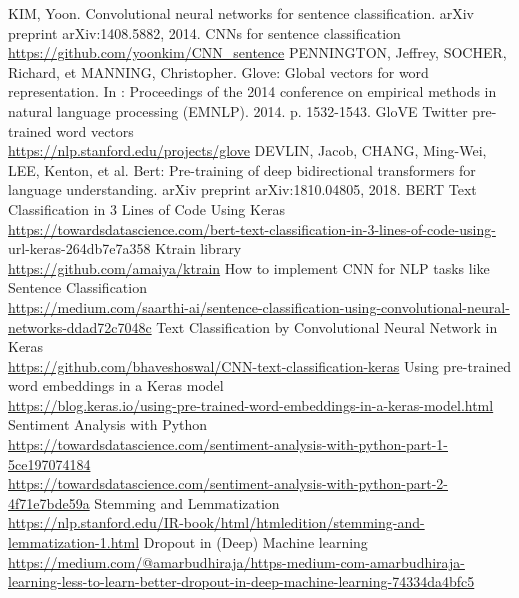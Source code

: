 \documentclass[11pt, a4paper, twocolumn]{article}
\begin{document}
\begin{thebibliography}{9}
		KIM, Yoon. Convolutional neural networks for sentence classification. arXiv preprint arXiv:1408.5882, 2014.
		CNNs for sentence classification
		\\\url{https://github.com/yoonkim/CNN\_sentence}
		PENNINGTON, Jeffrey, SOCHER, Richard, et MANNING, Christopher. Glove: Global vectors for word representation. In : Proceedings of the 2014 conference on empirical methods in natural language processing (EMNLP). 2014. p. 1532-1543.
		GloVE Twitter pre-trained word vectors
		\\\url{https://nlp.stanford.edu/projects/glove}
		DEVLIN, Jacob, CHANG, Ming-Wei, LEE, Kenton, et al. Bert: Pre-training of deep bidirectional transformers for language understanding. arXiv preprint arXiv:1810.04805, 2018.
		BERT Text Classification in 3 Lines of Code Using Keras
		\\\url{https://towardsdatascience.com/bert-text-classification-in-3-lines-of-code-using-}
		\\url{-keras-264db7e7a358}
		Ktrain library
		\\\url{https://github.com/amaiya/ktrain}
		How to implement CNN for NLP tasks like Sentence Classification
		\\\url{https://medium.com/saarthi-ai/sentence-classification-using-convolutional-neural-networks-ddad72c7048c}
		Text Classification by Convolutional Neural Network in Keras
		\\\url{https://github.com/bhaveshoswal/CNN-text-classification-keras}
		Using pre-trained word embeddings in a Keras model
		\\\url{https://blog.keras.io/using-pre-trained-word-embeddings-in-a-keras-model.html}
		Sentiment Analysis with Python
		\\\url{https://towardsdatascience.com/sentiment-analysis-with-python-part-1-5ce197074184}
		\\\url{https://towardsdatascience.com/sentiment-analysis-with-python-part-2-4f71e7bde59a}
		Stemming and Lemmatization
		\\\url{https://nlp.stanford.edu/IR-book/html/htmledition/stemming-and-lemmatization-1.html}
	Dropout in (Deep) Machine learning
	\\\url{https://medium.com/@amarbudhiraja/https-medium-com-amarbudhiraja-learning-less-to-learn-better-dropout-in-deep-machine-learning-74334da4bfc5}
\end{thebibliography}
\end{document}

